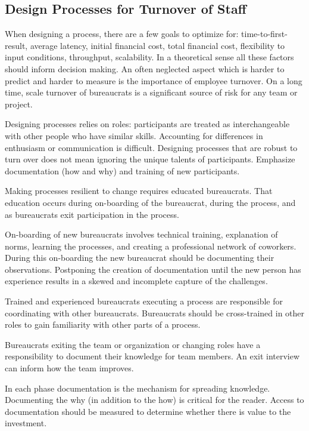 \subsection{Design Processes for Turnover of Staff\label{sec:turnover}}


When designing a process, there are a few goals to optimize for: time-to-first-result, average latency, initial financial cost, total financial cost, flexibility to input conditions, throughput, scalability. In a theoretical sense all these factors should inform decision making. An often neglected aspect which is harder to predict and harder to measure is the importance of employee turnover. On a long time, scale turnover of bureaucrats is a significant source of risk for any team or project. 

Designing processes relies on roles: participants are treated as interchangeable with other people who have similar skills. Accounting for differences in enthusiasm or communication is difficult. 
Designing processes that are robust to turn over does not mean ignoring the unique talents of participants. 
Emphasize documentation (how and why) and training of new participants. 

Making processes resilient to change requires educated bureaucrats. That education occurs during on-boarding of the bureaucrat, during the process, and as bureaucrats exit participation in the process. 

On-boarding of new bureaucrats involves technical training, explanation of norms, learning the processes, and creating a professional network of coworkers. During this on-boarding the new bureaucrat should be documenting their observations. Postponing the creation of documentation until the new person has experience results in a skewed and incomplete capture of the challenges.

Trained and experienced bureaucrats executing a process are responsible for coordinating with other bureaucrats. Bureaucrats should be cross-trained in other roles to gain familiarity with other parts of a process. 

Bureaucrats exiting the team or organization or changing roles have a responsibility to document their knowledge for team members. An exit interview can inform how the team improves. 

In each phase documentation is the mechanism for spreading knowledge. Documenting the why (in addition to the how) is critical for the reader. Access to documentation should be measured to determine whether there is value to the investment. 